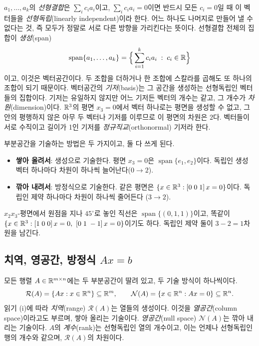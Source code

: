 \documentclass[11pt]{article}
\begin{document}
$a_1,\dots,a_k$의 \emph{선형결합}은 $\sum_i c_ia_i$이고, $\sum_ic_ia_i=0$이면
반드시 모든 $c_i=0$일 때 이 벡터들을 \emph{선형독립}(linearly independent)이라
한다. 어느 하나도 나머지로 만들어 낼 수 없다는 것, 즉 모두가 정말로 서로 다른
방향을 가리킨다는 뜻이다. 선형결합 전체의 집합이 \emph{생성}(span)
\[
   \operatorname{span}\{a_1,\dots,a_k\} = \Bigl\{\,\sum_{i=1}^{k}c_ia_i \;:\; c_i\in\mathbb{R}\Bigr\}
\]
이고, 이것은 벡터공간이다. 두 조합을 더하거나 한 조합에 스칼라를 곱해도 또 하나의
조합이 되기 때문이다. 벡터공간의 \emph{기저}(basis)는 그 공간을 생성하는 선형독립인
벡터들의 집합이다. 기저는 유일하지 않지만 어느 기저든 벡터의 개수는 같고, 그 개수가
\emph{차원}(dimension)이다. $\mathbb{R}^{3}$의 평면 $x_3=0$에서 벡터 하나로는 평면을 생성할
수 없고, 그 안의 평행하지 않은 아무 두 벡터나 기저를 이루므로 이 평면의 차원은 $2$다.
벡터들이 서로 수직이고 길이가 1인 기저를 \emph{정규직교}(orthonormal) 기저라 한다.

부분공간을 기술하는 방법은 두 가지이고, 둘 다 쓰게 된다.
\begin{itemize}[leftmargin=*,itemsep=2pt]
\item \textbf{쌓아 올려서}: 생성으로 기술한다. 평면 $x_3=0$은
$\operatorname{span}\{e_1,e_2\}$이다. 독립인 생성 벡터 하나마다 차원이 하나씩
늘어난다($0\to2$).
\item \textbf{깎아 내려서}: 방정식으로 기술한다. 같은 평면은
$\{x\in\mathbb{R}^{3}:[0\;0\;1]\,x=0\}$이다. 독립인 제약 하나마다 차원이 하나씩 줄어든다
($3\to2$).
\end{itemize}
$x_2x_3$-평면에서 원점을 지나 $45^\circ$로 놓인 직선은
$\operatorname{span}\{(0,1,1)\}$이고, 똑같이
$\{x\in\R^{3}: [1\;0\;0]\,x=0,\ [0\;1\;-1]\,x=0\}$이기도 하다. 독립인 제약 둘이
$3-2=1$차원을 남긴다.

\subsection{치역, 영공간, 방정식 \texorpdfstring{$Ax=b$}{Ax=b}}
\label{sec:rangenull}
모든 행렬 $A\in\mathbb{R}^{m\times n}$에는 두 부분공간이 딸려 있고, 두 기술 방식이 하나씩이다.
\begin{equation}\label{eq:rangenull}
   \mathcal R(A) = \{Ax : x\in\mathbb{R}^{n}\}\subseteq\mathbb{R}^{m},
   \qquad
   \mathcal N(A) = \{x\in\mathbb{R}^{n} : Ax=0\}\subseteq\mathbb{R}^{n}.
\end{equation}
읽기 (i)에 따라 \emph{치역}(range) $\mathcal R(A)$는 열들의 생성이다. 이것을
\emph{열공간}(column space)이라고도 부르며, 쌓아 올리는 기술이다. \emph{영공간}(null
space) $\mathcal N(A)$는 깎아 내리는 기술이다. $A$의 \emph{계수}(rank)는 선형독립인
열의 개수이고, 이는 언제나 선형독립인 행의 개수와 같으며, $\mathcal R(A)$의 차원이다.
\end{document}
